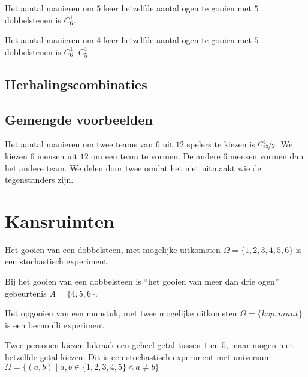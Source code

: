 \documentclass[main.tex]{subfiles}
\begin{document}
\begin{vb}
  Het aantal manieren om $5$ keer hetzelfde aantal ogen te gooien met $5$ dobbelstenen is $C_{6}^{1}$.
\end{vb}

\begin{vb}
  Het aantal manieren om $4$ keer hetzelfde aantal ogen te gooien met $5$ dobbelstenen is $C_{6}^{1}\cdot C_{5}^{1}$.
\end{vb}

\subsection*{Herhalingscombinaties}

\subsection{Gemengde voorbeelden}

\begin{vb}
  Het aantal manieren om twee teams van $6$ uit $12$ spelers te kiezen is $\nicefrac{C^{6}_{12}}{2}$.
  We kiezen $6$ mensen uit $12$ om een team te vormen.
  De andere $6$ mensen vormen dan het andere team.
  We delen door twee omdat het niet uitmaakt wie de tegenstanders zijn.
\end{vb}



\newpage 
\section{Kansruimten}

\begin{vb}
  Het gooien van een dobbelsteen, met mogelijke uitkomsten $\Omega = \{1,2,3,4,5,6\}$ is een stochastisch experiment.
\end{vb}

\begin{vb}
  Bij het gooien van een dobbelsteen is ``het gooien van meer dan drie ogen'' gebeurtenis $A =\{4,5,6\}$.
\end{vb}

\begin{vb}
  Het opgooien van een munstuk, met twee mogelijke uitkomsten $\Omega = \{kop, munt\}$ is een bernoulli experiment
\end{vb}

\begin{vb}
  Twee personen kiezen lukraak een geheel getal tussen $1$ en $5$, maar mogen niet hetzelfde getal kiezen.
  Dit is een stochastisch experiment met universum $\Omega = \{ (a,b) \mid a,b \in \{1,2,3,4,5 \} \wedge a \neq b \}$
\end{vb}
\end{document}
